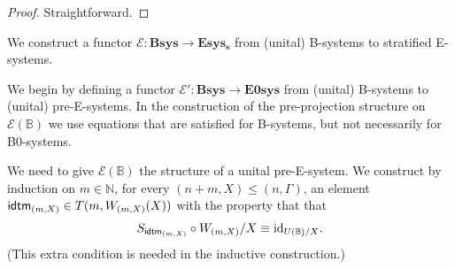 \begin{proof}
Straightforward.
\end{proof}

\begin{defn}
We construct a functor $\mathcal{E}:\mathbf{Bsys}\to\mathbf{Esys_s}$ from (unital) B-systems to stratified E-systems.
\end{defn}

\begin{constr}
We begin by defining a functor $\mathcal{E'}:\mathbf{Bsys}\to\mathbf{E0sys}$
from (unital) B-systems to (unital) pre-E-systems.
In the construction of the pre-projection structure on $\mathcal{E}(\mathbb{B})$ we use equations that are satisfied for B-systems, but not necessarily for B0-systems.

We need to give $\mathcal{E}(\mathbb{B})$ the structure of a unital
pre-E-system. We construct by induction on $m\in \mathbb{N}$, 
for every $(n+m,X)\leq (n,\Gamma)$, an element $\tfid{(m,X)}\in T(m,W_{(m,X)}(X))$ with the property that that 
\begin{equation*}
S_{\tfid{(m,X)}}\circ W_{(m,X)}/X\jdeq\catid{U(\mathbb{B})/X}.
\end{equation*}
(This extra condition is needed in the inductive construction.) 


\end{constr}
